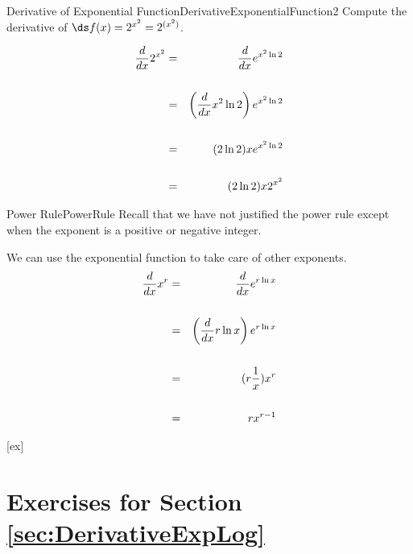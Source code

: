 \begin{example}{Derivative of Exponential Function}{DerivativeExponentialFunction2}
Compute the derivative of $\ds f(x)=2^{x^2}=2^{(x^2)}$.
\end{example}

\begin{solution} 
\begin{eqnarray*}
{d\over dx}2^{x^2} &=& {d\over dx}e^{x^2\ln 2}\\
\\
&=& \left({d\over dx} x^2\ln 2\right) e^{x^2\ln 2}\\
\\
&=& (2\ln 2) x  e^{x^2\ln 2}\\
\\
&= & (2\ln 2) x 2^{x^2}
\end{eqnarray*}\vspace{-0.2cm}
\end{solution}

\begin{example}{Power Rule}{PowerRule} 
Recall that we have not justified the power rule except when the
exponent is a positive or negative integer.
\end{example}

\begin{solution} 
We can use the exponential function to take care of other exponents.
\begin{eqnarray*}
{d\over dx}x^r&=&{d\over dx}e^{r\ln x}\\
\\
&=&\left({d\over dx}r\ln x\right)e^{r\ln x}\\
\\
&=&(r{1\over x})x^r\\
\\
&=&rx^{r-1}
\end{eqnarray*}
\end{solution}


[ex]
\section*{Exercises for Section \ref{sec:DerivativeExpLog}}

